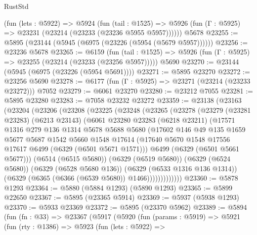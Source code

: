 \begin{lexlean}{RustStd}
\begin{coremodule}
{{    (fun (lets : @5922) =>
    @5924
      (fun (tail : @1525) =>
      @5926 (fun (Γ : @5925) => @23231 (@23214 (@23233 (@23236 @5955 @5957))))))
    @5678
@23255 := @5895 (@23144 (@5945 (@6975 (@23226 (@5954 (@5679 @5957))))))
@23256 := @23236 @5678
@23265 := @6159
    (fun (tail : @1525) => @5926 (fun (Γ : @5925) => @23255 (@23214 (@23233 (@23256 @5957)))))
    @5690
@23270 := @23144 (@5945 (@6975 (@23226 (@5954 @5691))))
@23271 := @5895 @23270
@23272 := @23256 @5690
@23278 := @6177 (fun (Γ : @5925) => @23271 (@23214 (@23233 @23272))) @7052
@23279 := @6061 @23270
@23280 := @23212 @7055
@23281 := @5895 @23280
@23283 := @7058 @23232 @23272
@23359 := @23138
    (@23163
      (@23204
        (@23206
          (@23208
            (@23225
              (@23248
                (@23265
                  (@23278
                    (@23279
                      (@23281 @23283)
                      (@6213 @23143)
                      (@6061
                        @23280
                        @23283
                        (@6218 @23211)
                        (@17571
                          @1316
                          @279
                          @136
                          @1314
                          @5678
                          @5688
                          @5680
                          (@17602
                            @146
                            @49
                            @135
                            @1659
                            @5677
                            @5687
                            @1542
                            @5660
                            @1548
                            @17614
                            (@17640 @5670 @1548 @17556 @17617 @6499 (@6329 (@6501 @5671 @1571)))
                            @6499
                            (@6329 (@6501 @5661 @5677)))
                          (@6514 (@6515 @5680))
                          (@6329 (@6519 @5680))
                          (@6329 (@6524 @5680))
                          (@6329 (@6528 @5680 @136))
                          (@6329 (@6533 @1316 @136 @1314))
                          (@6329 (@6365 (@6366 (@6539 @5680)) @1466)))))))))))))
@23360 := @5878 @1293
@23364 := @5880 (@5884 @1293) (@5890 @1293)
@23365 := @5899 @22650
@23367 := @5895 (@23365 @5914)
@23369 := @5937 (@5938 @1293)
@23370 := @5933 @23369
@23372 := @5895 (@23370 @5962)
@23389 := @5894
    (fun (fn : @33) =>
    @23367
      (@5917
        (@5920
          (fun (params : @5919) =>
          @5921
            (fun (rty : @1386) =>
            @5923
              (fun (lets : @5922) =>
}}
\end{coremodule}
\end{lexlean}
